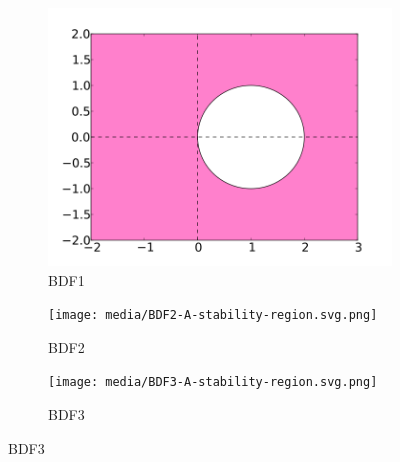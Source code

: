 \begin{figure}[h]
    \centering
    \begin{subfigure}{0.3\textwidth}
        \centering
        \includegraphics[width=\textwidth]{media/BDF1-A-stability-region.svg.png}
        \caption{BDF1}
    \end{subfigure}
    \begin{subfigure}{0.3\textwidth}
        \centering
        \texttt{[image: media/BDF2-A-stability-region.svg.png]}
        \caption{BDF2}
    \end{subfigure}
    \begin{subfigure}{0.3\textwidth}
        \centering
        \texttt{[image: media/BDF3-A-stability-region.svg.png]}
        \caption{BDF3}
    \end{subfigure}


\end{figure}

